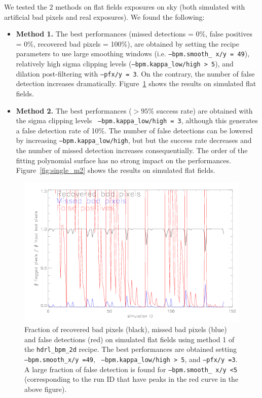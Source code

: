 We tested the 2 methods on flat fields exposures on sky (both
simulated with artificial bad pixels and real exposures). We found the
following:

\begin{itemize}
\item {\bf Method 1.}  The best performances (missed detections = 0\%,
  false positives = 0\%, recovered bad pixels = 100\%), are obtained
  by setting the recipe parameters to use large smoothing windows
  (i.e. {\tt --bpm.smooth\_ x/y = 49}), relatively high sigma clipping
  levels ({\tt --bpm.kappa\_low/high > 5}), and dilation
  post-filtering with {\tt --pfx/y = 3}. On the contrary, the number of
  false detection increases dramatically. Figure~\ref{fig:single_m1}
  shows the results on simulated flat fields.

\item {\bf Method 2.}  The best performances ($>95$\% success rate)
  are obtained with the sigma clipping levels {\tt
    --bpm.kappa\_low/high = 3}, although this generates a false
  detection rate of 10\%. The number of false detections can be
  lowered by increasing {\tt --bpm.kappa\_low/high}, but but the
  success rate decreases and the number of missed detection increases
  consequentially. The order of the fitting polynomial surface has no
  strong impact on the performances. Figure~\ref{fig:single_m2} shows
  the results on simulated flat fields.

\end{itemize}


\begin{figure} 
 \subfigure
\includegraphics[width=17cm]{figures/recovered_bad_pixels_m1.png}
 \caption{Fraction of recovered bad pixels (black), missed bad pixels
   (blue) and false detections (red) on simulated flat fields using
   method 1 of the {\tt hdrl\_bpm\_2d} recipe. The best performances
   are obtained setting {\tt --bpm.smooth\_x/y =49}, {\tt
     --bpm.kappa\_low/high > 5}, and {\tt --pfx/y =3}. A large
   fraction of false detection is found for {\tt --bpm.smooth\_ x/y
     <5} (corresponding to the run ID that have peaks in the red curve
   in the above figure).}
\label{fig:single_m1}
\end{figure}


